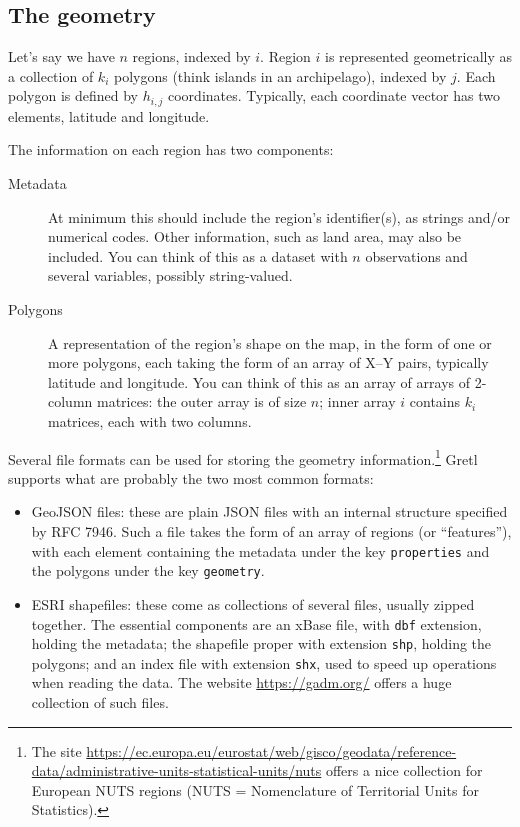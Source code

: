 \documentclass{article}
\begin{document}
\subsection{The geometry}
\label{sec:geometry}

Let's say we have $n$ regions, indexed by $i$. Region $i$ is
represented geometrically as a collection of $k_i$ polygons (think
islands in an archipelago), indexed by $j$. Each polygon is defined by
$h_{i,j}$ coordinates. Typically, each coordinate vector has two
elements, latitude and longitude.

The information on each region has two components:
\begin{description}
\item[Metadata] At minimum this should include the region's
  identifier(s), as strings and/or numerical codes. Other information,
  such as land area, may also be included. You can think of this as a
  dataset with $n$ observations and several variables, possibly
  string-valued.
\item[Polygons] A representation of the region's shape on the map, in
  the form of one or more polygons, each taking the form of an array
  of X--Y pairs, typically latitude and longitude. You can think of
  this as an array of arrays of 2-column matrices: the outer array is
  of size $n$; inner array $i$ contains $k_i$ matrices, each with two
  columns.
\end{description}

Several file formats can be used for storing the geometry
information.\footnote{The site
\url{https://ec.europa.eu/eurostat/web/gisco/geodata/reference-data/administrative-units-statistical-units/nuts}
offers a nice collection for European NUTS regions (NUTS =
Nomenclature of Territorial Units for Statistics).}
Gretl supports what are probably the two most common formats:
\begin{itemize}
\item GeoJSON files: these are plain JSON files with an internal
  structure specified by RFC 7946. Such a file takes the form of an
  array of regions (or ``features''), with each element containing the
  metadata under the key \texttt{properties} and the polygons under
  the key \texttt{geometry}.
\item ESRI shapefiles: these come as collections of several files,
  usually zipped together. The essential components are an
  \textsf{xBase} file, with \texttt{dbf} extension, holding the
  metadata; the shapefile proper with extension \texttt{shp}, holding
  the polygons; and an index file with extension \texttt{shx}, used to
  speed up operations when reading the data. The website
  \url{https://gadm.org/} offers a huge collection of such files.
\end{itemize}
\end{document}
